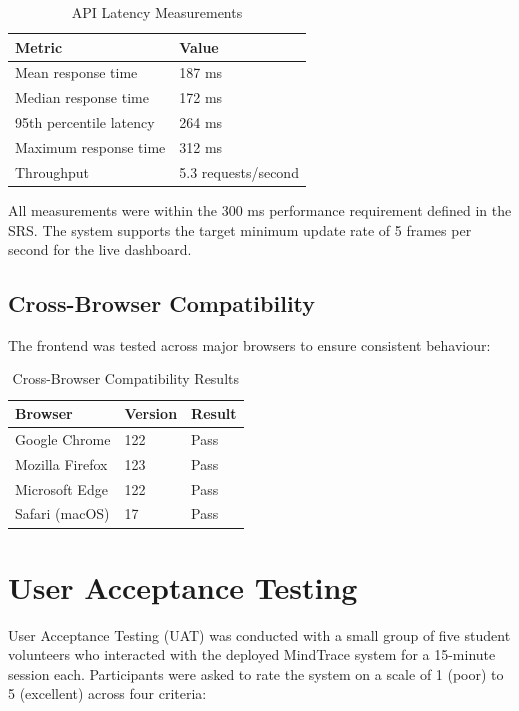 \begin{table}[H]
\centering
\caption{API Latency Measurements}
\begin{tabular}{ll}
\toprule
\textbf{Metric}           & \textbf{Value} \\
\midrule
Mean response time        & 187 ms \\
Median response time      & 172 ms \\
95th percentile latency   & 264 ms \\
Maximum response time     & 312 ms \\
Throughput                & 5.3 requests/second \\
\bottomrule
\end{tabular}
\end{table}

All measurements were within the 300 ms performance requirement defined in
the SRS. The system supports the target minimum update rate of 5 frames
per second for the live dashboard.

\subsection{Cross-Browser Compatibility}

The frontend was tested across major browsers to ensure consistent behaviour:

\begin{table}[H]
\centering
\caption{Cross-Browser Compatibility Results}
\begin{tabular}{lll}
\toprule
\textbf{Browser}     & \textbf{Version} & \textbf{Result} \\
\midrule
Google Chrome        & 122              & Pass \\
Mozilla Firefox      & 123              & Pass \\
Microsoft Edge       & 122              & Pass \\
Safari (macOS)       & 17               & Pass \\
\bottomrule
\end{tabular}
\end{table}

\section{User Acceptance Testing}

User Acceptance Testing (UAT) was conducted with a small group of five
student volunteers who interacted with the deployed MindTrace system for a
15-minute session each. Participants were asked to rate the system on a
scale of 1 (poor) to 5 (excellent) across four criteria:

